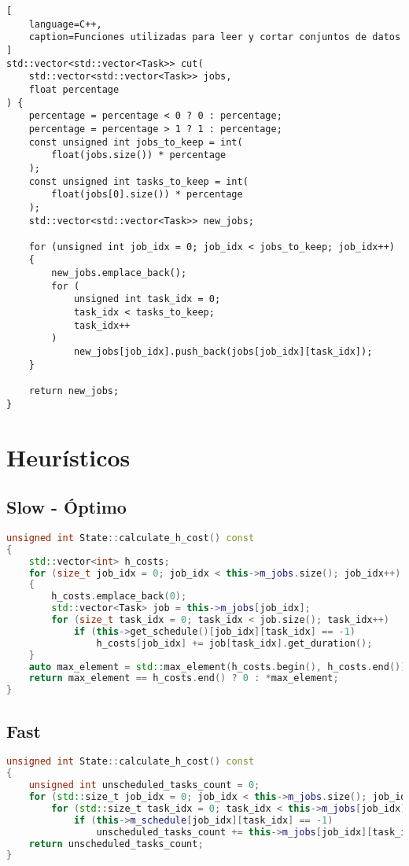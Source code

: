 \begin{lstlisting}[
    language=C++,
    caption=Funciones utilizadas para leer y cortar conjuntos de datos
]
std::vector<std::vector<Task>> cut(
    std::vector<std::vector<Task>> jobs,
    float percentage
) {
    percentage = percentage < 0 ? 0 : percentage;
    percentage = percentage > 1 ? 1 : percentage;
    const unsigned int jobs_to_keep = int(
        float(jobs.size()) * percentage
    );
    const unsigned int tasks_to_keep = int(
        float(jobs[0].size()) * percentage
    );
    std::vector<std::vector<Task>> new_jobs;

    for (unsigned int job_idx = 0; job_idx < jobs_to_keep; job_idx++)
    {
        new_jobs.emplace_back();
        for (
            unsigned int task_idx = 0;
            task_idx < tasks_to_keep;
            task_idx++
        )
            new_jobs[job_idx].push_back(jobs[job_idx][task_idx]);
    }

    return new_jobs;
}
\end{lstlisting}

\pagebreak
\section{Heurísticos}

\subsection{Slow - Óptimo}
\label{ssec:SlowOptimo}

\begin{lstlisting}[language=C++]
unsigned int State::calculate_h_cost() const
{
    std::vector<int> h_costs;
    for (size_t job_idx = 0; job_idx < this->m_jobs.size(); job_idx++)
    {
        h_costs.emplace_back(0);
        std::vector<Task> job = this->m_jobs[job_idx];
        for (size_t task_idx = 0; task_idx < job.size(); task_idx++)
            if (this->get_schedule()[job_idx][task_idx] == -1)
                h_costs[job_idx] += job[task_idx].get_duration();
    }
    auto max_element = std::max_element(h_costs.begin(), h_costs.end());
    return max_element == h_costs.end() ? 0 : *max_element;
}
\end{lstlisting}

\subsection{Fast}
\label{ssec:Fast}

\begin{lstlisting}[language=C++]
unsigned int State::calculate_h_cost() const
{
    unsigned int unscheduled_tasks_count = 0;
    for (std::size_t job_idx = 0; job_idx < this->m_jobs.size(); job_idx++)
        for (std::size_t task_idx = 0; task_idx < this->m_jobs[job_idx].size(); task_idx++)
            if (this->m_schedule[job_idx][task_idx] == -1)
                unscheduled_tasks_count += this->m_jobs[job_idx][task_idx].get_duration();
    return unscheduled_tasks_count; 
}
\end{lstlisting}

\pagebreak
